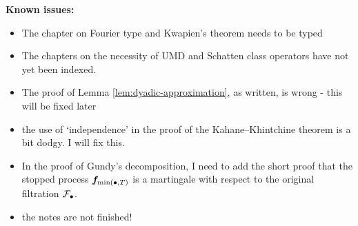 \textbf{Known issues:}
\begin{itemize}
\item The chapter on Fourier type and Kwapien's theorem needs to be typed
\item The chapters on the necessity of UMD and Schatten class operators have not yet been indexed.
\item The proof of Lemma \ref{lem:dyadic-approximation}, as written, is wrong - this will be fixed later
\item the use of `independence' in the proof of the Kahane--Khintchine theorem is a bit dodgy. I will fix this.
\item In the proof of Gundy's decomposition, I need to add the short proof that the stopped process $\bm{f}_{\min(\bullet, T)}$ is a martingale with respect to the original filtration $\mathcal{F}_{\bullet}$.
\item the notes are not finished!
\end{itemize}

  





